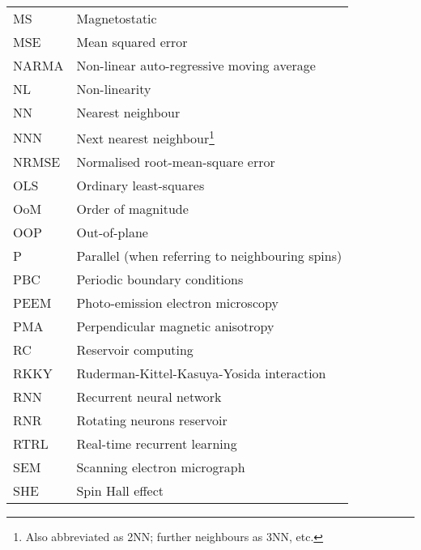 {\begin{longtable}[l]{ll}
        MS    & Magnetostatic                               \\
        MSE   & Mean squared error                          \\
        NARMA & Non-linear auto-regressive moving average   \\
        NL    & Non-linearity                               \\
        NN    & Nearest neighbour                           \\
        NNN   & Next nearest neighbour\footnote{Also abbreviated as 2NN; further neighbours as 3NN, etc.} \\
        NRMSE & Normalised root-mean-square error           \\
        OLS   & Ordinary least-squares                      \\
        OoM   & Order of magnitude                          \\
        OOP   & Out-of-plane                                \\
        P     & Parallel (when referring to neighbouring spins) \\
        PBC   & Periodic boundary conditions                \\
        PEEM  & Photo-emission electron microscopy          \\
        PMA   & Perpendicular magnetic anisotropy           \\
        RC    & Reservoir computing                         \\
        RKKY  & Ruderman-Kittel-Kasuya-Yosida interaction   \\
        RNN   & Recurrent neural network                    \\
        RNR   & Rotating neurons reservoir                  \\
        RTRL  & Real-time recurrent learning                \\
        SEM   & Scanning electron micrograph                \\
        SHE   & Spin Hall effect                            \\

\end{longtable}}
